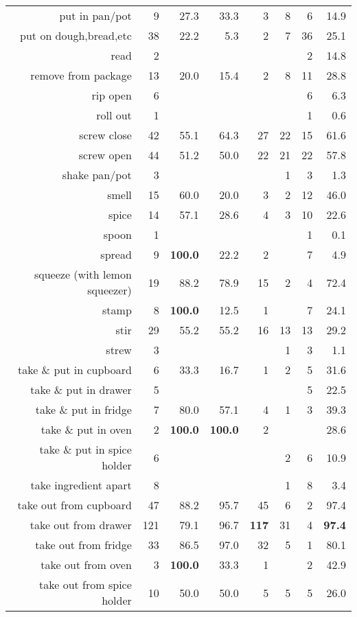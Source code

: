 \begin{tabular}{r r r@{\ \ }r@{\ \ }r@{\ \ }r@{\ \ }r r}
put in pan/pot & 9 & 27.3 & 33.3 & 3 & 8 & 6 & 14.9 \\
put on dough,bread,etc & 38 & 22.2 & 5.3 & 2 & 7 & 36 & 25.1 \\
read & 2 &  &  &  &  & 2 & 14.8 \\
remove from package & 13 & 20.0 & 15.4 & 2 & 8 & 11 & 28.8 \\
rip open & 6 &  &  &  &  & 6 & 6.3 \\
roll out & 1 &  &  &  &  & 1 & 0.6 \\
screw close & 42 & 55.1 & 64.3 & 27 & 22 & 15 & 61.6 \\
screw open & 44 & 51.2 & 50.0 & 22 & 21 & 22 & 57.8 \\
shake pan/pot & 3 &  &  &  & 1 & 3 & 1.3 \\
smell & 15 & 60.0 & 20.0 & 3 & 2 & 12 & 46.0 \\
spice & 14 & 57.1 & 28.6 & 4 & 3 & 10 & 22.6 \\
spoon & 1 &  &  &  &  & 1 & 0.1 \\
spread & 9 & \textbf{100.0} & 22.2 & 2 &  & 7 & 4.9 \\
squeeze (with lemon squeezer) & 19 & 88.2 & 78.9 & 15 & 2 & 4 & 72.4 \\
stamp & 8 & \textbf{100.0} & 12.5 & 1 &  & 7 & 24.1 \\
stir & 29 & 55.2 & 55.2 & 16 & 13 & 13 & 29.2 \\
strew & 3 &  &  &  & 1 & 3 & 1.1 \\
take \& put in cupboard & 6 & 33.3 & 16.7 & 1 & 2 & 5 & 31.6 \\
take \& put in drawer & 5 &  &  &  &  & 5 & 22.5 \\
take \& put in fridge & 7 & 80.0 & 57.1 & 4 & 1 & 3 & 39.3 \\
take \& put in oven & 2 & \textbf{100.0} & \textbf{100.0} & 2 &  &  & 28.6 \\
take \& put in spice holder & 6 &  &  &  & 2 & 6 & 10.9 \\
take ingredient apart & 8 &  &  &  & 1 & 8 & 3.4 \\
take out from cupboard & 47 & 88.2 & 95.7 & 45 & 6 & 2 & 97.4 \\
take out from drawer & 121 & 79.1 & 96.7 & \textbf{117} & 31 & 4 & \textbf{97.4} \\
take out from fridge & 33 & 86.5 & 97.0 & 32 & 5 & 1 & 80.1 \\
take out from oven & 3 & \textbf{100.0} & 33.3 & 1 &  & 2 & 42.9 \\
take out from spice holder & 10 & 50.0 & 50.0 & 5 & 5 & 5 & 26.0 \\

\end{tabular}
